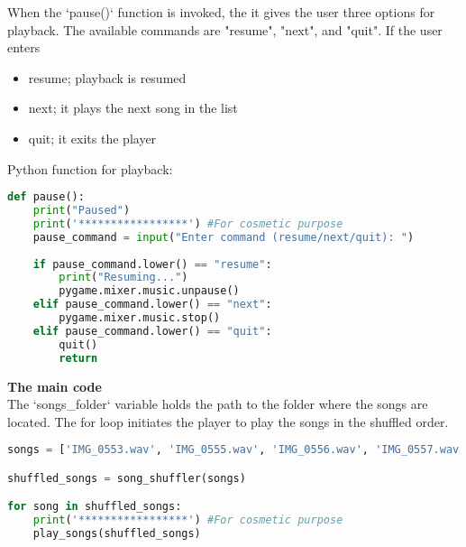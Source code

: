 \documentclass[journal,12pt,twocolumn]{IEEEtran}
\begin{document}
When the `pause()` function is invoked, the it gives the user three options for playback. The available commands are "resume", "next", and "quit". If the user enters
\begin{itemize}
    \item resume; playback is resumed
    \item next; it plays the next song in the list
    \item quit; it exits the player
\end{itemize}
Python function for playback:\cite{pause}
\begin{lstlisting}[language=Python, caption=Pause function]
def pause():
    print("Paused")
    print('*****************') #For cosmetic purpose
    pause_command = input("Enter command (resume/next/quit): ")
    
    if pause_command.lower() == "resume":
        print("Resuming...")
        pygame.mixer.music.unpause()
    elif pause_command.lower() == "next":
        pygame.mixer.music.stop()
    elif pause_command.lower() == "quit":
        quit()
        return
\end{lstlisting}

\textbf{The main code\\}
The `songs\_folder` variable holds the path to the folder where the songs are located. The for loop initiates the player to play the songs in the shuffled order.
\begin{lstlisting}[language=Python, caption=Main code which invokes the functions]
songs = ['IMG_0553.wav', 'IMG_0555.wav', 'IMG_0556.wav', 'IMG_0557.wav', 'IMG_0558.wav', 'IMG_0559.wav', 'IMG_0560.wav', 'IMG_0561.wav', 'IMG_0562.wav', 'IMG_0563.wav', 'IMG_0565.wav', 'IMG_0566.wav', 'IMG_0567.wav', 'IMG_0568.wav', 'IMG_0569.wav', 'IMG_0570.wav', 'IMG_0571.wav', 'IMG_0572.wav', 'IMG_0574.wav', 'IMG_0575.wav']

shuffled_songs = song_shuffler(songs)

for song in shuffled_songs:
    print('*****************') #For cosmetic purpose
    play_songs(shuffled_songs)
\end{lstlisting}


\end{document}
